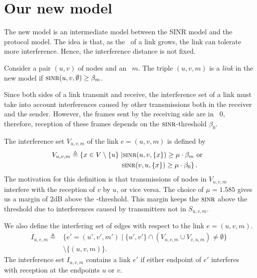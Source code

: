 \documentclass[12pt,oneside,english,a4paper]{book}
\theoremstyle{plain}
\theoremstyle{definition}
\theoremstyle{Theorem}
\newtheorem{claim}[thm]{Claim}
\theoremstyle{plain}
\newenvironment{proof sketch}[1]{\noindent {\emph{Proof sketch of #1:}}}{\hfill \qed}
\newcommand{\eqdf}{\triangleq}
\newcommand{\SINR}{\text{\sc{sinr}}}
\newcommand{\SNR}{\text{\sc{snr}}}
\newcommand{\MCS}{\text{\sc{mcs}}}
\begin{document}
\section{Our new model}
The new model is an intermediate model between the SINR model and the
protocol model. The idea is that, as the \SNR\ of a link grows, the
link can tolerate more interference. Hence, the interference distance
is not fixed.

Consider a pair $(u,v)$ of nodes and an \MCS\ $m$.
The triple $(u,v,m)$ is a \emph{link} in the new model if
$\SINR(u,v,\emptyset) \geq \beta_m$.

Since both sides of a link transmit and receive, the interference set
of a link must take into account interferences caused by other
transmissions both in the receiver and the sender. However, the frames
sent by the receiving side are in \MCS\ $0$, therefore, reception of
these frames depends on the $\SINR$-threshold $\beta_0$.

The interference set $V_{u,v,m}$ of the link $e=(u,v,m)$ is defined by
  \begin{align*}
    V_{u,v,m} \eqdf \left\{ x \in V \setminus\{u\}\right. &\left | \SINR(u,v,\{x\}) \geq \mu  \cdot \beta_m \text{ or } \right. \\
    & \left.\SINR(v,u,\{x\}) \geq \mu \cdot \beta_0\right\}.
\end{align*}
The motivation for this definition is that transmissions of nodes in $V_{u,v,m}$ interfere with
the reception of $v$ by $u$, or vice versa.
The choice of $\mu=1.585$ gives us a margin of $2$dB above the
\SINR-threshold.  This margin keeps the $\SINR$ above the threshold
due to interferences caused by transmitters not in $S_{u,v,m}$.

We also define the interfering set of edges with respect to the link $e=(u,v,m)$.
\begin{align*}
  I_{u,v,m} \eqdf &\{ e'=(u',v',m') \mid \{u',v'\} \cap (V_{u,v,m} \cup V_{v,u,m})
 \neq \emptyset\}\\& \setminus \{(u,v,m)\}.
\end{align*}
The interference set $I_{u,v,m}$ contains a link $e'$ if either
endpoint of $e'$ interferes with reception at the endpoints $u$ or
$v$.

\end{document}
